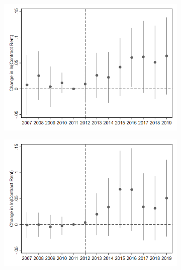\documentclass[12pt]{article}
\begin{document}
{{{{{{\begin{figure}
\begin{center}
\caption{Impact of Hurricane Sandy on Voucher Rents}
\begin{subfigure}[b]{0.4\textwidth}
\includegraphics[scale=0.41]{Voucher Rents/R3 High Surge Voucher Rents_all vouchers.png}
\label{fig:highsurgevch}
\end{subfigure}
\hfill
\begin{subfigure}[b]{0.4\textwidth}
\includegraphics[scale=0.41]{Voucher Rents/R3 Low Surge Voucher Rent_all vouchers.png}
\label{fig:lowsurgevch}
\end{subfigure}
\begin{subfigure}[b]{0.4\textwidth}

\end{subfigure}
\end{center}
\end{figure}}}}}}}
\end{document}
